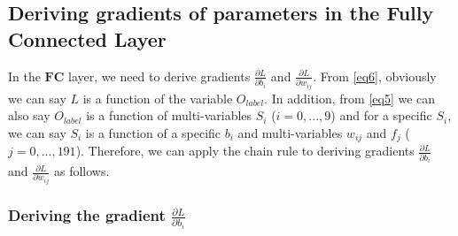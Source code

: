 \documentclass[a4paper,12pt]{article}
\begin{document}
\medskip

\subsection{Deriving gradients of parameters in the Fully Connected Layer}

In the $\boldsymbol{FC}$ layer, we need to derive gradients $\frac{\partial{L}}{\partial{b_i}}$ and $\frac{\partial{L}}{\partial{w_{ij}}}$. From \eqref{eq6}, obviously we can say $L$ is a function of the variable $O_{label}$. In addition, from \eqref{eq5} we can also say $O_{label}$ is a function of multi-variables $S_i$ ($i = 0, ..., 9$) and for a specific $S_i$, we can say $S_i$ is a function of a specific $b_i$ and multi-variables $w_{ij}$ and $f_j$ ($j = 0, ..., 191$). Therefore, we can apply the chain rule to deriving gradients $\frac{\partial{L}}{\partial{b_i}}$ and $\frac{\partial{L}}{\partial{w_{ij}}}$ as follows.

\subsubsection{Deriving the gradient $\frac{\partial{L}}{\partial{b_i}}$}
\end{document}
